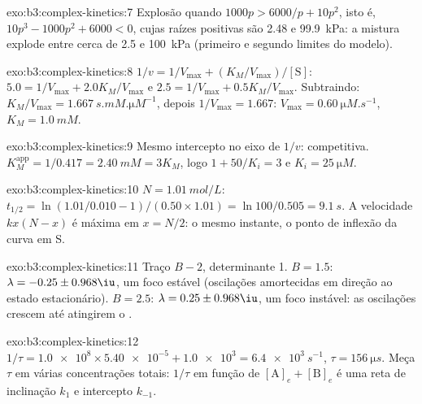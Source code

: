 \begin{solution}{exo:b3:complex-kinetics:7}
Explosão quando $1000p > 6000/p + 10p^2$, isto é, $10p^3 - 1000p^2 + 6000 < 0$, cujas raízes
positivas são 2.48 e \qty{99.9}{kPa}: a mistura explode entre cerca de 2.5 e
\qty{100}{kPa} (primeiro e segundo limites do modelo).
\end{solution}

\begin{solution}{exo:b3:complex-kinetics:8}
$1/v = 1/V_{\max} + (K_M/V_{\max})/[\mathrm S]$: $5.0 = 1/V_{\max} + 2.0K_M/V_{\max}$ e $2.5 = 1/V_{\max} + 0.5K_M/V_{\max}$.
Subtraindo: $K_M/V_{\max} = \qty{1.667}{s.mM.\micro M^{-1}}$, depois $1/V_{\max} = 1.667$: $V_{\max} = \qty{0.60}{\micro M.s^{-1}}$,
$K_M = \qty{1.0}{mM}$.
\end{solution}

\begin{solution}{exo:b3:complex-kinetics:9}
Mesmo intercepto no eixo de $1/v$: competitiva. $K_M^{\mathrm{app}} = 1/0.417 = \qty{2.40}{mM} = 3K_M$, logo
$1 + 50/K_i = 3$ e $K_i = \qty{25}{\micro M}$.
\end{solution}

\begin{solution}{exo:b3:complex-kinetics:10}
$N = \qty{1.01}{mol/L}$: $t_{1/2} = \ln(1.01/0.010 - 1)/(0.50 \times 1.01) = \ln100/0.505 = \qty{9.1}{s}$. A
velocidade $kx(N - x)$ é máxima em $x = N/2$: o mesmo instante, o ponto de inflexão
da curva em S.
\end{solution}

\begin{solution}{exo:b3:complex-kinetics:11}
Traço $B - 2$, determinante 1. $B = 1.5$: $\lambda = -0.25 \pm 0.968\iu$, um foco estável (oscilações
amortecidas em direção ao estado estacionário). $B = 2.5$: $\lambda = 0.25 \pm 0.968\iu$, um foco
instável: as oscilações crescem até atingirem o .
\end{solution}

\begin{solution}{exo:b3:complex-kinetics:12}
$1/\tau = \num{1.0e8} \times \num{5.40e-5} + \num{1.0e3} = \qty{6.4e3}{s^{-1}}$, $\tau = \qty{156}{\micro s}$. Meça $\tau$ em várias
concentrações totais: $1/\tau$ em função de $[\mathrm A]_e + [\mathrm B]_e$ é uma reta de inclinação $k_1$ e
intercepto $k_{-1}$.
\end{solution}

